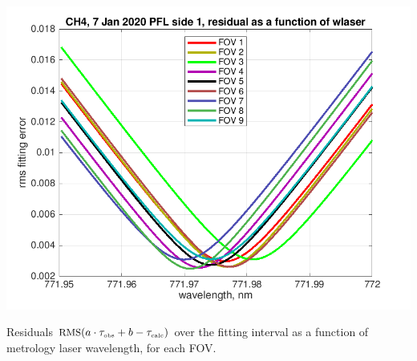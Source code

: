 \documentclass[10pt]{beamer}
\begin{document}
\begin{frame}
\begin{columns}[t]
\begin{column}{0.5\textwidth}
  \begin{centering}
  \includegraphics[width=\textwidth]{figures/CH4_wlaser_fit.png}
  \end{centering}\vspace{3mm}

Residuals $\mbox{\small RMS}(a\cdot\tau_{\mbox{\tiny obs}} + b - \tau_{\mbox{\tiny calc}})$ over the fitting
interval as a function of metrology laser wavelength, for each FOV.

\end{column}
\end{columns}
\end{frame}
\end{document}
